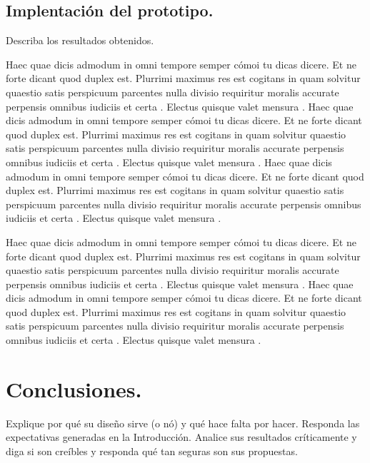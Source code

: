 \documentclass[10pt]{article}
\begin{document}
\subsection{Implentación del prototipo.}


Describa los resultados obtenidos. 



Haec quae dicis admodum in omni tempore semper cómoi tu dicas dicere. Et ne forte dicant quod duplex est. Plurrimi maximus res est cogitans in quam solvitur quaestio satis perspicuum parcentes nulla divisio requiritur moralis accurate perpensis omnibus iudiciis et certa . Electus quisque valet mensura .
Haec quae dicis admodum in omni tempore semper cómoi tu dicas dicere. Et ne forte dicant quod duplex est. Plurrimi maximus res est cogitans in quam solvitur quaestio satis perspicuum parcentes nulla divisio requiritur moralis accurate perpensis omnibus iudiciis et certa . Electus quisque valet mensura .
Haec quae dicis admodum in omni tempore semper cómoi tu dicas dicere. Et ne forte dicant quod duplex est. Plurrimi maximus res est cogitans in quam solvitur quaestio satis perspicuum parcentes nulla divisio requiritur moralis accurate perpensis omnibus iudiciis et certa . Electus quisque valet mensura .

Haec quae dicis admodum in omni tempore semper cómoi tu dicas dicere. Et ne forte dicant quod duplex est. Plurrimi maximus res est cogitans in quam solvitur quaestio satis perspicuum parcentes nulla divisio requiritur moralis accurate perpensis omnibus iudiciis et certa . Electus quisque valet mensura .
Haec quae dicis admodum in omni tempore semper cómoi tu dicas dicere. Et ne forte dicant quod duplex est. Plurrimi maximus res est cogitans in quam solvitur quaestio satis perspicuum parcentes nulla divisio requiritur moralis accurate perpensis omnibus iudiciis et certa . Electus quisque valet mensura .




\section{Conclusiones.}

Explique por qué su diseño sirve (o nó) y qué hace falta por hacer.
Responda las expectativas generadas en la Introducción.
Analice sus resultados críticamente y diga si son creíbles y responda qué tan seguras son sus propuestas. 



 
 
\end{document}
